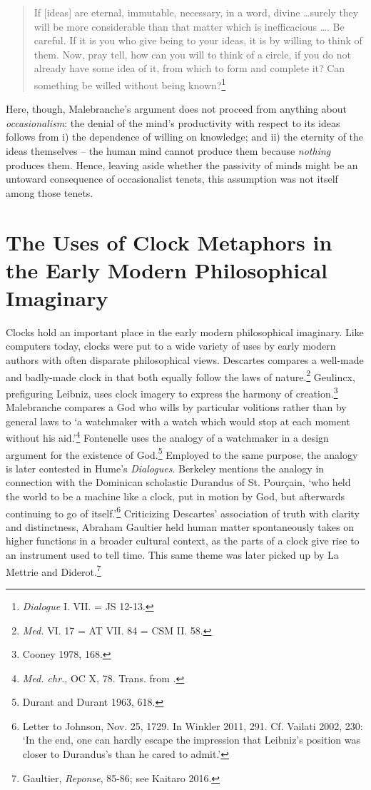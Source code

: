 \documentclass{article}
\begin{document}
\begin{quote}
If {[}ideas{]} are eternal, immutable, necessary, in a word, divine
\ldots surely they will be more considerable than that matter
which is inefficacious \ldots. Be careful. If it is you who give
being to your ideas, it is by willing to think of them. Now, pray tell,
how can you will to think of a circle, if you do not already have some
idea of it, from which to form and complete it? Can something be willed
without being known?\footnote{\emph{Dialogue} I. VII. = JS 12-13.}
\end{quote}

Here, though, Malebranche's argument does not proceed from anything
about \emph{occasionalism}: the denial of the mind's productivity with
respect to its ideas follows from i) the dependence of willing on
knowledge; and ii) the eternity of the ideas themselves -- the human
mind cannot produce them because \emph{nothing} produces them. Hence,
leaving aside whether the passivity of minds might be an untoward
consequence of occasionalist tenets, this assumption was not itself
among those tenets.

\section{The Uses of Clock Metaphors in the Early Modern Philosophical
Imaginary}

Clocks hold an important place in the early modern philosophical
imaginary. Like computers today, clocks were put to a wide variety of
uses by early modern authors with often disparate philosophical views.
Descartes compares a well-made and badly-made clock in that both equally
follow the laws of nature.\footnote{\emph{Med.} VI. 17 = AT VII. 84 =
  CSM II. 58.} Geulincx, prefiguring Leibniz, uses clock imagery to
express the harmony of creation.\footnote{Cooney 1978, 168.} Malebranche
compares a God who wills by particular volitions rather than by general
laws to `a watchmaker with a watch which would stop at each moment
without his aid.'\footnote{\emph{Med. chr.}, OC X, 78. Trans. from \autocite[235]{Wahl2011}.} Fontenelle uses the analogy of a watchmaker in a design
argument for the existence of God.\footnote{Durant and Durant 1963, 618.}
Employed to the same purpose, the analogy is later contested in Hume's
\emph{Dialogues}. Berkeley mentions the analogy in connection with the
Dominican scholastic Durandus of St. Pourçain, `who held the world to be
a machine like a clock, put in motion by God, but afterwards continuing
to go of itself.'\footnote{Letter to Johnson, Nov. 25, 1729. In Winkler
  2011, 291. Cf. Vailati 2002, 230: `In the end, one can hardly escape
  the impression that Leibniz's position was closer to Durandus's than
  he cared to admit.'} Criticizing Descartes' association of truth with
clarity and distinctness, Abraham Gaultier held human matter
spontaneously takes on higher functions in a broader cultural context,
as the parts of a clock give rise to an instrument used to tell time.
This same theme was later picked up by La Mettrie and Diderot.\footnote{Gaultier,
  \emph{Reponse}, 85-86; see Kaitaro 2016.}
\end{document}

